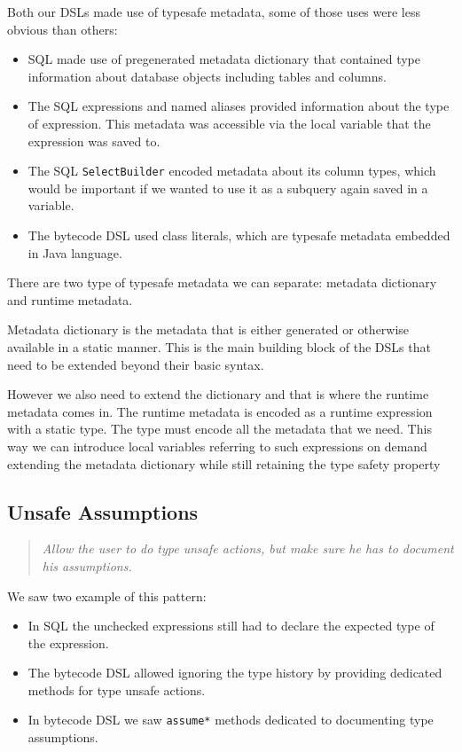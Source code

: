 \documentclass{sig-alternate}
\begin{document}
Both our DSLs made use of typesafe metadata, some of those uses were less obvious than others:
\begin{itemize}
\item SQL made use of pregenerated metadata dictionary that contained type information about database objects including tables and columns.
\item The SQL expressions and named aliases provided information about the type of expression. This metadata was accessible via the local variable that the expression was saved to.
\item The SQL \verb!SelectBuilder! encoded metadata about its column types, which would be important if we wanted to use it as a subquery again saved in a variable.
\item The bytecode DSL used class literals, which are typesafe metadata embedded in Java language.
\end{itemize}

There are two type of typesafe metadata we can separate: metadata dictionary and runtime metadata. 

Metadata dictionary is the metadata that is either generated or otherwise available in a static manner. This is the main building block of the DSLs that need to be extended beyond their basic syntax. 

However we also need to extend the dictionary and that is where the runtime metadata comes in. The runtime metadata is encoded as a runtime expression with a static type. The type must encode all the metadata that we need. This way we can introduce local variables referring to such expressions on demand extending the metadata dictionary while still retaining the type safety property

\subsection{Unsafe Assumptions}

\begin{quote}
\emph{Allow the user to do type unsafe actions, but make sure he has to document his assumptions.}
\end{quote}

We saw two example of this pattern:
\begin{itemize}
\item In SQL the unchecked expressions still had to declare the expected type of the expression.
\item The bytecode DSL allowed ignoring the type history by providing dedicated methods for type unsafe actions.
\item In bytecode DSL we saw \verb!assume*! methods dedicated to documenting type assumptions.
\end{itemize}
\end{document}
